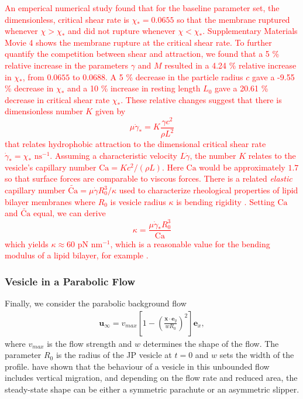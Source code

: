 \documentclass[lineno]{jfm}
\newcommand{\xx}{\mathbf{x}}
\newcommand{\uu}{\mathbf{u}}
\newcommand{\ReviewerOne}[1]{\textcolor{red}{#1}}
\begin{document}
\ReviewerOne{An emperical numerical study found that for the baseline parameter set,
the dimensionless, critical shear rate is $\chi_*=0.0655$ so that the membrane ruptured whenever $\chi > \chi_*$
  and did not rupture whenever $\chi < \chi_*.$ 
  Supplementary Materials Movie 4 shows the membrane rupture at the critical shear rate.
  To further quantify the competition between shear and attraction,
  we found that a 5 \% relative increase in the parameters $\gamma$ and $M$ 
  resulted in a  4.24 \% relative increase in $\chi_*$, from $0.0655$ to $0.0688$.
  A 5 \% decrease in the particle radius $c$ gave a -9.55 \% decrease in $\chi_*$
  and a 10 \% increase in resting length $L_0$ gave a 20.61 \% decrease in critical shear rate $\chi_*$.
  These relative changes suggest that there is dimensionless number $K$ given by 
  \begin{equation}
    \label{eq:CSR}
  \mu \dot\gamma_* = K \frac{\gamma c^2}{\rho L^2}
  \end{equation}
  that relates hydrophobic attraction to the dimensional critical shear rate $\dot \gamma_* = \chi_* \text{ ns}^{-1}$.
  Assuming a characteristic velocity $L\dot \gamma$, the number $K$ relates to the vesicle's capillary number
  $\text{Ca} = K c^2/(\rho L)$. Here $\text{Ca}$ would be approximately $1.7$
  so that surface forces are comparable to viscous forces.  
  There is a related \emph{elastic} capillary number
  $\tilde{\text{Ca}} = \mu \dot{\gamma} R_0^3/\kappa$
  used to characterize rheological properties of lipid bilayer membranes
  where $R_0$ is vesicle radius $\kappa$ is bending rigidity \citep{VLAHOVSKA2009775, keller_skalak_1982}. 
  Setting $\text{Ca}$ and $\tilde{\text{Ca}}$ equal, we can derive
  \[
  \kappa = \frac{\mu \dot \gamma_* R_0^3}{\text{Ca}}
  \]
  which yields $\kappa \approx 60$ pN $\text{nm}^{-1}$, which is a reasonable
  value for the bending modulus of a lipid bilayer, for example \citep{NaTr00}.}



\subsubsection{Vesicle in a Parabolic Flow}
\label{sec:ves_in_parabolic}
Finally, we consider the parabolic background flow
\begin{align}
  \uu_\infty = v_{max}\left[ 1 - \left( 
    \frac{\xx \cdot \mathbf{e}_y}{wR_0}\right)^2
    \right]\mathbf{e}_x,
\end{align}
%
where $v_{max}$ is the flow strength and $w$ determines the shape of the
flow. The parameter $R_0$ is the radius of the JP vesicle at $t=0$ and
$w$ sets the width of the profile. \cite{Kaoui09, cou-kao-pod-mis2008,
dan-vla-mis2009} have shown that the behaviour of a vesicle in this
unbounded flow includes vertical migration, and depending on the flow
rate and reduced area, the steady-state shape can be either a symmetric
parachute or an asymmetric slipper.
\end{document}
